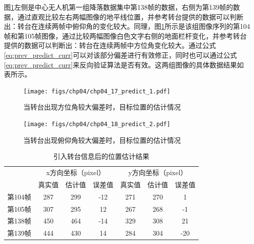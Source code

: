 图\ref{fig:chp04_17_predict_1}左侧是中心无人机第一组降落数据集中第138帧的数据，右侧为第139帧的数据，通过直观比较左右两幅图像的地平线位置，并参考转台提供的数据可以判断出：转台在连续两帧中俯仰角的变化较大。同理，图\ref{fig:chp04_17_predict_1}所示是该组图像序列的第104帧和第105帧图像，通过比较两幅图像白色文字右侧的地面栏杆变化，并参考转台提供的数据可以判断出：转台在连续两帧中方位角变化较大。通过公式\ref{eq:prev_predict_curr}可以对该部分偏差进行有效修正，同时也可以通过公式\ref{eq:prev_predict_curr}来反向验证算法是否有效。这两组图像的具体数据结果如表所示。

\begin{figure}[ht]
	\centering
	\texttt{[image: figs/chp04/chp04\_17\_predict\_1.pdf]}
	\caption{当转台出现方位角较大偏差时，目标位置的估计情况}
	\label{fig:chp04_17_predict_1}
\end{figure}

\begin{figure}[ht]   
	\centering
	\texttt{[image: figs/chp04/chp04\_18\_predict\_2.pdf]}
	\caption{当转台出现俯仰角较大偏差时，目标位置的估计情况}
	\label{fig:chp04_18_predict_2}
\end{figure}

\begin{table}[]
	\centering
	\caption{引入转台信息后的位置估计结果}
	\label{my-label}
	\begin{tabular}{lccc|ccc}
		\hline
		& \multicolumn{3}{c|}{x方向坐标（pixel）}                         & \multicolumn{3}{c}{y方向坐标（pixel）}   \\ \cline{2-7} 
		& 真实值 & \multicolumn{1}{l}{估计值} & \multicolumn{1}{l|}{误差值} & 真实值 & 估计值 & \multicolumn{1}{l}{误差值} \\ \hline
		\multicolumn{1}{c}{第104帧} & 287 & 299                     & -12                      & 271 & 270 & 1                       \\
		\multicolumn{1}{c}{第105帧} & 307 & 295                     & 12                       & 267 & 268 & -1                      \\ \hline
		第138帧                     & 450 & 464                     & -14                      & 329 & 308 & 21                      \\
		第139帧                     & 444 & 430                     & 14                       & 284 & 304 & -20                     \\ \hline
	\end{tabular}
\end{table}

